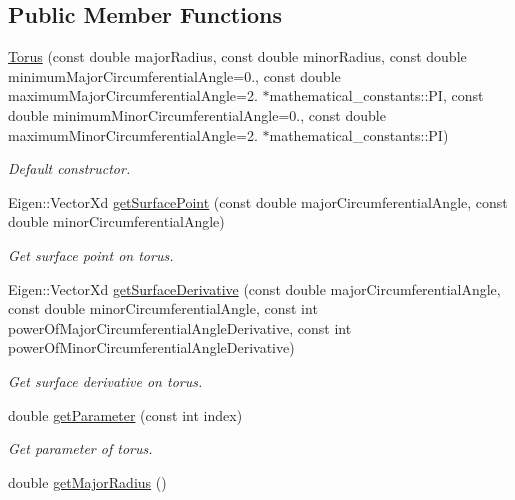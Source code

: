 \subsection*{Public Member Functions}
\begin{DoxyCompactItemize}
\item 
\hyperlink{classtudat_1_1geometric__shapes_1_1Torus_a9ceb9b97d31907f567829a2cc11476e9}{Torus} (const double major\+Radius, const double minor\+Radius, const double minimum\+Major\+Circumferential\+Angle=0., const double maximum\+Major\+Circumferential\+Angle=2. $\ast$mathematical\+\_\+constants\+::\+PI, const double minimum\+Minor\+Circumferential\+Angle=0., const double maximum\+Minor\+Circumferential\+Angle=2. $\ast$mathematical\+\_\+constants\+::\+PI)
\begin{DoxyCompactList}\small\item\em Default constructor. \end{DoxyCompactList}\item 
Eigen\+::\+Vector\+Xd \hyperlink{classtudat_1_1geometric__shapes_1_1Torus_a4d4945c2926a530d6bab05f503d849b3}{get\+Surface\+Point} (const double major\+Circumferential\+Angle, const double minor\+Circumferential\+Angle)
\begin{DoxyCompactList}\small\item\em Get surface point on torus. \end{DoxyCompactList}\item 
Eigen\+::\+Vector\+Xd \hyperlink{classtudat_1_1geometric__shapes_1_1Torus_ab2eee5aafe47effb68b2c85d06ecf1dc}{get\+Surface\+Derivative} (const double major\+Circumferential\+Angle, const double minor\+Circumferential\+Angle, const int power\+Of\+Major\+Circumferential\+Angle\+Derivative, const int power\+Of\+Minor\+Circumferential\+Angle\+Derivative)
\begin{DoxyCompactList}\small\item\em Get surface derivative on torus. \end{DoxyCompactList}\item 
double \hyperlink{classtudat_1_1geometric__shapes_1_1Torus_a4a6878288913f56d7dbf97519a706f3b}{get\+Parameter} (const int index)
\begin{DoxyCompactList}\small\item\em Get parameter of torus. \end{DoxyCompactList}\item 
double \hyperlink{classtudat_1_1geometric__shapes_1_1Torus_a9d6097a83aa258379ff9100b3e0647f3}{get\+Major\+Radius} ()

\end{DoxyCompactItemize}
